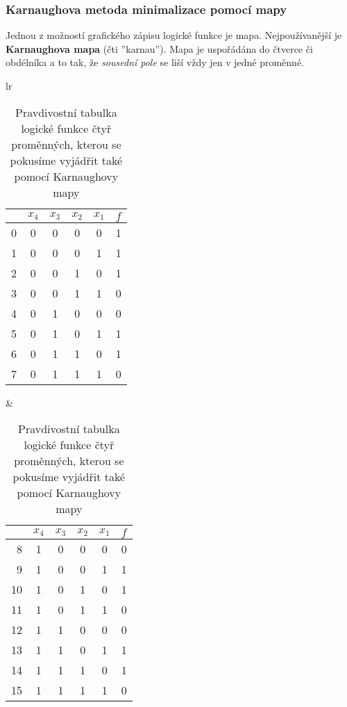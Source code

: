     \subsubsection{Karnaughova metoda minimalizace pomocí mapy}  
      Jednou z možností grafického zápisu logické funkce je mapa. Nejpoužívanější je \textbf{Karnaughova mapa} (čti ''karnau''). 
      Mapa je uspořádána do čtverce či obdélníka a to tak, že \emph{sousední pole} se liší vždy jen v jedné proměnné.
      \begin{table}
        \centering
        \begin{tabular}{lr}
          \begin{tabular}[t]{r|cccc|c}
             \rowcolor{Gray}{\textbf{Index}}& {$x_4$} & {$x_3$} & {$x_2$} & {$x_1$} & {$f$} \\
             \hline
             0&0&0&0&0&1\\
             1&0&0&0&1&1\\
             2&0&0&1&0&1\\
             3&0&0&1&1&0\\
             4&0&1&0&0&0\\
             5&0&1&0&1&1\\
             6&0&1&1&0&1\\
             7&0&1&1&1&0\\
          \end{tabular}
        &
          \begin{tabular}[t]{r|cccc|c}
            \rowcolor{Gray}{\textbf{Index}}& {$x_4$} & {$x_3$} & {$x_2$} & {$x_1$} & {$f$} \\
            \hline
            8&1&0&0&0&0\\
            9&1&0&0&1&1\\
            10&1&0&1&0&1\\
            11&1&0&1&1&0\\
            12&1&1&0&0&0\\
            13&1&1&0&1&1\\
            14&1&1&1&0&1\\
            15&1&1&1&1&0\\
          \end{tabular}
        \end{tabular}
        \caption[Pravdivostní tabulka logické funkce]{Pravdivostní tabulka logické funkce čtyř proměnných, kterou se pokusíme
        vyjádřit také pomocí Karnaughovy mapy}
        \label{CES:tab_true1}
      \end{table} 

